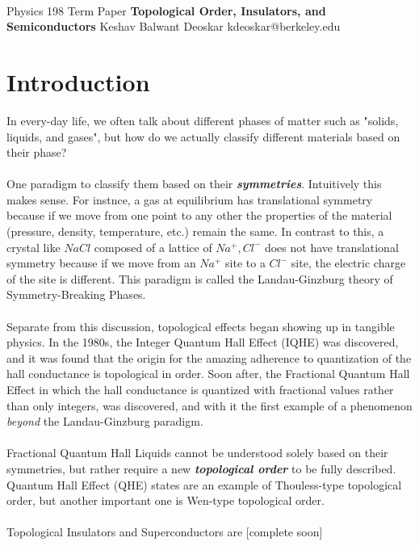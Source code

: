 \documentclass[11pt]{article}
\begin{document}
\thispagestyle{empty}
\bigskip \
\vspace{0.1cm}

\begin{center}
{\fontsize{22}{22} \selectfont Physics 198 Term Paper}
\vskip 16pt
{\fontsize{36}{36} \selectfont \bf \sffamily Topological Order, Insulators, and Semiconductors}
\vskip 24pt
{\fontsize{18}{18} \selectfont \rmfamily Keshav Balwant Deoskar} 
\vskip 6pt
{\fontsize{14}{14} \selectfont \ttfamily kdeoskar@berkeley.edu} 
\vskip 24pt
\end{center}


\microtoc
\newpage

\section{Introduction}
In every-day life, we often talk about different phases of matter such as "solids, liquids, and gases", but how do we actually classify different materials based on their phase? 
\\
\\
One paradigm to classify them based on their \textbf{\emph{symmetries}}. Intuitively this makes sense. For instnce, a gas at equilibrium has translational symmetry because if we move from one point to any other the properties of the material (pressure, density, temperature, etc.) remain the same. In contrast to this, a crystal like $NaCl$ composed of a lattice of $Na^+, Cl^-$ does not have translational symmetry because if we move from an $Na^+$ site to a $Cl^-$ site, the electric charge of the site is different. This paradigm is called the Landau-Ginzburg theory of Symmetry-Breaking Phases.
\\
\\
Separate from this discussion, topological effects began showing up in tangible physics. In the 1980s, the Integer Quantum Hall Effect (IQHE) was discovered, and it was found that the origin for the amazing adherence to quantization of the hall conductance is topological in order. Soon after, the Fractional Quantum Hall Effect in which the hall conductance is quantized with fractional values rather than only integers, was discovered, and with it the first example of a phenomenon \emph{beyond} the Landau-Ginzburg paradigm. 
\\
\\
Fractional Quantum Hall Liquids cannot be understood solely based on their symmetries, but rather require a new \textbf{\emph{topological order}} to be fully described. Quantum Hall Effect (QHE) states are an example of Thouless-type topological order, but another important one is Wen-type topological order. 
\\
\\
Topological Insulators and Superconductors are [complete soon]
\end{document}
